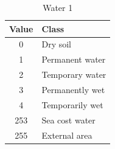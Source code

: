 \documentclass[Lau]{sapthesis} %
\begin{document}
%
\begin{table}[ht]
\centering
\begin{tabular}{|c|l|}
\hline
\textbf{Value} & \textbf{Class}\\
\hline
0 & Dry soil\\
1 & Permanent water\\
2 & Temporary water\\
3 & Permanently wet\\
4 & Temporarily wet\\
253 & Sea cost water\\
255 & External area\\
\hline
\end{tabular}
\caption{Water 1}
\label{tab:water1}
\end{table}


\end{document}
